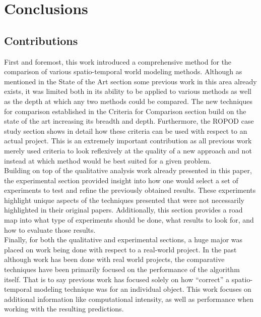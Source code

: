 

    \chapter{Conclusions}

    \section{Contributions}

    First and foremost, this work introduced a comprehensive method for the
    comparison of various spatio-temporal world modeling methods. Although as
    mentioned in the State of the Art section some previous work in this area
    already exists, it was limited both in its ability to be applied to various
    methods as well as the depth at which any two methods could be compared. The
    new techniques for comparison established in the Criteria for Comparison
    section build on the state of the art increasing its breadth and depth.
    Furthermore, the ROPOD case study section shows in detail how these criteria
    can be used with respect to an actual project. This is an extremely important
    contribution as all previous work merely used criteria to look reflexively
    at the quality of a new approach and not instead at which method would be
    best suited for a given problem. \\

    Building on top of the qualitative analysis work already presented in this
    paper, the experimental section provided insight into how one would select
    a set of experiments to test and refine the previously obtained results.
    These experiments highlight unique aspects of the techniques presented that
    were not necessarily highlighted in their original papers. Additionally,
    this section provides a road map into what type of experiments should be
    done, what results to look for, and how to evaluate those results. \\

    Finally, for both the qualitative and experimental sections, a huge major
    was placed on work being done with respect to a real-world project. In the
    past although work has been done with real world projects, the comparative
    techniques have been primarily focused on the performance of the algorithm
    itself. That is to say previous work has focused solely on how ``correct''
    a spatio-temporal modeling technique was for an individual object. This work
    focuses on additional information like computational intensity, as well
    as performance when working with the resulting predictions. \\

